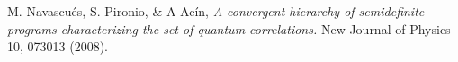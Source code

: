 \documentclass[letterpaper]{article}
\begin{document}
\begin{thebibliography}{}
    
 M. Navascués, S. Pironio, \& A Acín, 
         {\em A convergent hierarchy of semidefinite programs characterizing the
         set of quantum correlations.}
         New Journal of Physics 10, 073013 (2008).
   
         

         
\end{thebibliography}
\end{document}

